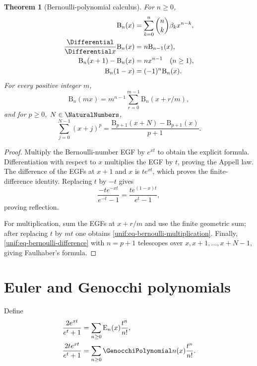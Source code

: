 \documentclass[11pt,a4paper,oneside,openany]{book}
\newtheorem{theorem}{Theorem}[chapter]
\theoremstyle{definition}
\theoremstyle{remark}
\newcommand{\BerP}[2]{\mathrm B_{#1}(#2)}
\newcommand{\EulP}[2]{\mathrm E_{#1}(#2)}
\begin{document}
\begin{theorem}[Bernoulli-polynomial calculus]
\label{unif:thm-bernoulli-polynomial-calculus}
For $n\ge0$,
\begin{align}
 \BerP n x&=\sum_{k=0}^{n}\binom nk\beta_kx^{n-k},
 \label{unif:eq-bernoulli-explicit}\\
 \frac{\Differential}{\Differential x}\BerP n x&=n\BerP{n-1}x,
 \label{unif:eq-bernoulli-appell}\\
 \BerP n{x+1}-\BerP n x&=nx^{n-1}\quad(n\ge1),
 \label{unif:eq-bernoulli-difference}\\
 \BerP n{1-x}&=(-1)^n\BerP n x.
 \label{unif:eq-bernoulli-reflection}
\end{align}
For every positive integer $m$,
\begin{equation}\label{unif:eq-bernoulli-multiplication}
 \BerP n{mx}=m^{n-1}\sum_{r=0}^{m-1}\BerP n{x+r/m},
\end{equation}
and for $p\ge0$, $N\in\NaturalNumbers$,
\begin{equation}\label{unif:eq-faulhaber-shifted}
 \sum_{j=0}^{N-1}(x+j)^p
 =\frac{\BerP{p+1}{x+N}-\BerP{p+1}x}{p+1}.
\end{equation}
\end{theorem}
\begin{proof}
Multiply the Bernoulli-number EGF by $e^{xt}$ to obtain the explicit formula.
Differentiation with respect to $x$ multiplies the EGF by $t$, proving the
Appell law. The difference of the EGFs at $x+1$ and $x$ is $te^{xt}$, which
proves the finite-difference identity. Replacing $t$ by $-t$ gives
\[
 \frac{-te^{-xt}}{e^{-t}-1}=\frac{te^{(1-x)t}}{e^t-1},
\]
proving reflection.

For multiplication, sum the EGFs at $x+r/m$ and use the finite geometric sum;
after replacing $t$ by $mt$ one obtains
\eqref{unif:eq-bernoulli-multiplication}. Finally,
\eqref{unif:eq-bernoulli-difference} with $n=p+1$ telescopes over
$x,x+1,\ldots,x+N-1$, giving Faulhaber's formula.
\end{proof}

\section{Euler and Genocchi polynomials}

Define
\begin{align}
 \frac{2e^{xt}}{e^t+1}
 &=\sum_{n\ge0}\EulP n x\frac{t^n}{n!},
 \label{unif:eq-euler-polynomial-egf}\\
 \frac{2te^{xt}}{e^t+1}
 &=\sum_{n\ge0}\GenocchiPolynomial n(x)\frac{t^n}{n!}.
 \label{unif:eq-genocchi-polynomial-egf}
\end{align}
\end{document}
